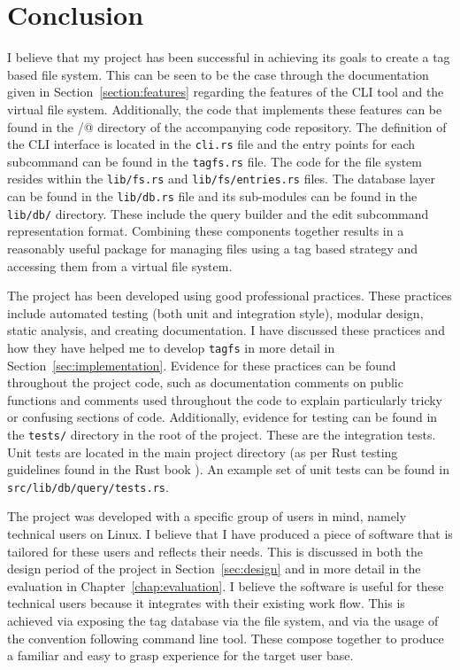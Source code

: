 \chapter{Conclusion}
\vspace{1cm}

I believe that my project has been successful in achieving its goals to create
a tag based file system. This can be seen to be the case through the
documentation given in Section~\ref{section:features} regarding the features of
the CLI tool and the virtual file system. Additionally, the code that
implements these features can be found in the \verb@src/@ directory of the
accompanying code repository. The definition of the CLI interface is located in
the \texttt{cli.rs} file and the entry points for each subcommand can be found
in the \texttt{tagfs.rs} file. The code for the file system resides within the
\texttt{lib/fs.rs} and \texttt{lib/fs/entries.rs} files. The database layer can
be found in the \texttt{lib/db.rs} file and its sub-modules can be found in the
\texttt{lib/db/} directory. These include the query builder and the edit
subcommand representation format. Combining these components together results
in a reasonably useful package for managing files using a tag based strategy
and accessing them from a virtual file system.

The project has been developed using good professional practices. These
practices include automated testing (both unit and integration style), modular
design, static analysis, and creating documentation. I have discussed these
practices and how they have helped me to develop \texttt{tagfs} in more detail
in Section~\ref{sec:implementation}. Evidence for these practices can be found
throughout the project code, such as documentation comments on public functions
and comments used throughout the code to explain particularly tricky or
confusing sections of code. Additionally, evidence for testing can be found in
the \texttt{tests/} directory in the root of the project. These are the
integration tests. Unit tests are located in the main project directory (as per
Rust testing guidelines found in the Rust book \cite{rust-testing}). An example
set of unit tests can be found in \texttt{src/lib/db/query/tests.rs}.

The project was developed with a specific group of users in mind, namely
technical users on Linux. I believe that I have produced a piece of software
that is tailored for these users and reflects their needs.
This is discussed in both the design period of the project in
Section~\ref{sec:design} and in more detail in the evaluation in
Chapter~\ref{chap:evaluation}. I believe the software is useful for these
technical users because it integrates with their existing work flow. This is
achieved via exposing the tag database via the file system, and via the usage
of the convention following command line tool. These compose together to
produce a familiar and easy to grasp experience for the target user base.
